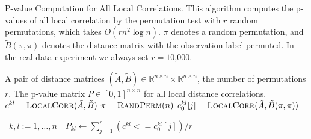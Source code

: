 \documentclass[11pt]{article}
\newcommand{\Real}{\mathbb{R}}
\newcommand{\G}{c}
\newcommand{\Linefor}[2]{%
    \State \algorithmicfor\ {#1}\ \algorithmicdo\ {#2} \algorithmicend\ \algorithmicfor%
}
\newcommand{\rto}{\leftarrow}
\begin{document}
\begin{algorithm}
\caption{P-value Computation for All Local Correlations. This algorithm computes the p-values of all local correlation by the permutation test with $r$ random permutations, which takes $O(rn^2 \log n)$. $\pi$ denotes a random permutation, and $\tilde{B}(\pi,\pi)$ denotes the distance matrix with the observation label permuted. In the real data experiment we always set $r=10$,$000$.}
\label{alg:pval}
\begin{algorithmic}[1]
\Require A pair of distance matrices $(\tilde{A},\tilde{B}) \in \Real^{n \times n} \times \Real^{n \times n}$, the number of permutations $r$.
\Ensure The p-value matrix $P \in [0,1]^{n \times n}$ for all local distance correlations.
\State $\G^{kl}=\textsc{LocalCorr}(\tilde{A},\tilde{B})$ 
\State $\pi=\textsc{RandPerm}(n)$  
\State $\G^{kl}_{0}[j]=\textsc{LocalCorr}(\tilde{A},\tilde{B}(\pi,\pi))$ 
\EndFor

\Linefor{$k,l:=1,\ldots,n$}{$P_{kl} \rto \sum_{j=1}^{r}(\G^{kl}<=\G^{kl}_{0}[j])/r$}
\EndFunction
\end{algorithmic}
\end{algorithm}
\end{document}
